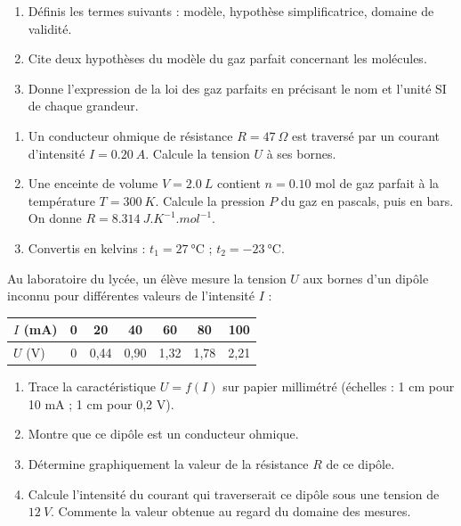 \documentclass[11pt]{article}
\newcommand{\cle}[1]{{\popxbold\color{popdark}#1}}
\newcounter{popsec}
\newcounter{popsub}
\newcommand{\courssub}[1]{%
  \stepcounter{popsub}%
  \par\vspace{9pt}\noindent{\popxbold\fontsize{11.5}{13}\selectfont\color{popink}{\color{poporange}\thepopsec.\thepopsub}\hspace{6pt}#1}\par\nopagebreak\vspace{4pt}
}
\begin{document}
\begin{exercice}
\begin{enumerate}
\item Définis les termes suivants : \cle{modèle}, \cle{hypothèse simplificatrice}, \cle{domaine de validité}.
\item Cite deux hypothèses du modèle du gaz parfait concernant les molécules.
\item Donne l'expression de la loi des gaz parfaits en précisant le nom et l'unité SI de chaque grandeur.
\end{enumerate}
\end{exercice}

\begin{exercice}
\begin{enumerate}
\item Un conducteur ohmique de résistance $R = \SI{47}{\Omega}$ est traversé par un courant d'intensité $I = \SI{0,20}{A}$. Calcule la tension $U$ à ses bornes.
\item Une enceinte de volume $V = \SI{2,0}{L}$ contient $n = \num{0,10}$ mol de gaz parfait à la température $T = \SI{300}{K}$. Calcule la pression $P$ du gaz en pascals, puis en bars. On donne $R = \SI{8,314}{J.K^{-1}.mol^{-1}}$.
\item Convertis en kelvins : $t_1 = \SI{27}{\celsius}$ ; $t_2 = \SI{-23}{\celsius}$.
\end{enumerate}
\end{exercice}

\courssub{Je m'entraîne}

\begin{exercice}
Au laboratoire du lycée, un élève mesure la tension $U$ aux bornes d'un dipôle inconnu pour différentes valeurs de l'intensité $I$ :
\begin{center}
\begin{tabular}{|l|*{6}{c|}}\hline
$I$ (mA) & 0 & 20 & 40 & 60 & 80 & 100 \\ \hline
$U$ (V) & 0 & 0,44 & 0,90 & 1,32 & 1,78 & 2,21 \\ \hline
\end{tabular}
\end{center}
\begin{enumerate}
\item Trace la caractéristique $U = f(I)$ sur papier millimétré (échelles : 1 cm pour 10 mA ; 1 cm pour 0,2 V).
\item Montre que ce dipôle est un conducteur ohmique.
\item Détermine graphiquement la valeur de la résistance $R$ de ce dipôle.
\item Calcule l'intensité du courant qui traverserait ce dipôle sous une tension de $\SI{12}{V}$. Commente la valeur obtenue au regard du domaine des mesures.
\end{enumerate}
\end{exercice}
\end{document}
